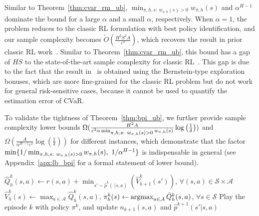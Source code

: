 \documentclass{article} %
\newcommand{\cA}{\mathcal{A}}
\newcommand{\cS}{\mathcal{S}}
\newcommand{\argmax}{\operatornamewithlimits{argmax}}
\newcommand{\sbr}[1]{\left( #1 \right)}
\newcommand{\algmin}{\mathtt{MaxWP}}
\begin{document}
	\vspace*{-0.5em}
	Similar to Theorem~\ref{thm:cvar_rm_ub}, $\min_{\pi,h,s:\ w_{\pi,h}(s)>0} w_{\pi,h}(s)$ and $\alpha^{H-1}$ dominate the bound for a large $\alpha$ and a small $\alpha$, respectively. When $\alpha=1$, the problem reduces to the classic RL formulation with best policy identification, and our sample complexity becomes $\tilde{O} ( \frac{H^3 S^2 A}{\varepsilon^2 } )$, which recovers the result in prior classic RL work~\citep{dann2017unifying}. Similar to Theorem~\ref{thm:cvar_rm_ub}, this bound has a gap of $HS$ to the state-of-the-art sample complexity for classic RL~\citep{menard2021fast}. This gap is due to the fact that the result in~\citep{menard2021fast} is obtained using the Bernstein-type exploration bonuses, which are more fine-grained for the classic RL problem but do not work for general risk-sensitive cases, because it cannot be used to  quantify the estimation error of CVaR. 
	
	
	To validate the tightness of Theorem~\ref{thm:bpi_ub}, we further provide sample complexity lower bounds $\Omega ( \frac{ H^2 A}{\varepsilon^2 \alpha \min_{\begin{subarray}{c}\pi,h,s:\  w_{\pi,h}(s)>0\end{subarray}} w_{\pi,h}(s)} \log \sbr{\frac{1}{\delta}} )$ and $\Omega ( \frac{A}{\alpha^{H-1} \varepsilon^2} \log \sbr{\frac{1}{\delta}} )$ for different instances, which demonstrate that the factor $\min \{ 1/\min_{\begin{subarray}{c}\pi,h,s:\  w_{\pi,h}(s)>0\end{subarray}} w_{\pi,h}(s),\ 1/\alpha^{H-1} \}$ is indispensable in general (see Appendix~\ref{apx:lb_bpi} for a formal statement of lower bound).
	
	
	\begin{algorithm}[t]
		\caption{$\algmin$} \label{alg:min}
		\KwIn{$\delta$, $\delta':=\frac{\delta}{2}$, $L:=\log(\frac{SA}{\delta'})$, $\hat{V}^k_{H+1}(s)=0$ for any $k>0$ and $s \in \cS$}
		{
			{
						$\hat{Q}^k_h(s,a) \leftarrow r(s,a)+\min_{s' \sim \hat{p}^k(\cdot|s,a)}(\hat{V}^k_{h+1}(s'))$, $\forall (s,a)\in\cS\times\cA$\;
					$\hat{V}^k_h(s) \leftarrow \max_{a \in \cA} \hat{Q}^k_h(s,a)$, 
					$\pi^k_h(s) \leftarrow  \argmax_{a \in \cA} \hat{Q}^k_h(s,a)$, $\forall s \in \cS$\;
			}
			Play the episode $k$ with policy $\pi^k$, and update $n_{k+1}(s,a)$ and $\hat{p}^{k+1}(s'|s,a)$\;
		}
	\end{algorithm}
	
\end{document}
